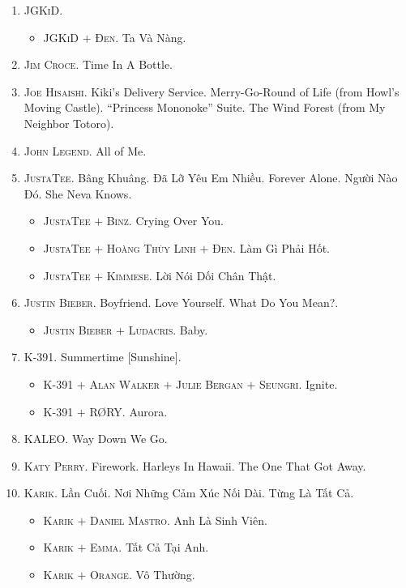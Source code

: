 \documentclass[oneside]{book}
\numberwithin{equation}{section}
\begin{document}
\begin{enumerate}
\begin{itemize}
	\end{itemize}
	\item \textsc{JGKiD.}
	\begin{itemize}
		\item \textsc{JGKiD $+$ Đen.} Ta Và Nàng.
	\end{itemize}
	\item \textsc{Jim Croce.} Time In A Bottle.
	\item \textsc{Joe Hisaishi.} Kiki's Delivery Service. Merry-Go-Round of Life (from Howl's Moving Castle). ``Princess Mononoke'' Suite. The Wind Forest (from My Neighbor Totoro).
	\item \textsc{John Legend.} All of Me.
	\item \textsc{JustaTee.} Bâng Khuâng. Đã Lỡ Yêu Em Nhiều. Forever Alone. Người Nào Đó. She Neva Knows.
	\begin{itemize}
		\item \textsc{JustaTee $+$ Binz.} Crying Over You.
		\item \textsc{JustaTee $+$ Hoàng Thùy Linh $+$ Đen.} Làm Gì Phải Hốt.
		\item \textsc{JustaTee $+$ Kimmese.} Lời Nói Dối Chân Thật.
	\end{itemize}
	\item \textsc{Justin Bieber.} Boyfriend. Love Yourself. What Do You Mean?.
	\begin{itemize}
		\item \textsc{Justin Bieber $+$ Ludacris.} Baby.
	\end{itemize}
	\item \textsc{K-391.} Summertime [Sunshine].
	\begin{itemize}
		\item \textsc{K-391 $+$ Alan Walker $+$ Julie Bergan $+$ Seungri.} Ignite.
		\item \textsc{K-391 $+$ R{\O}RY.} Aurora.
	\end{itemize}
	\item \textsc{KALEO.} Way Down We Go.
	\item \textsc{Katy Perry.} Firework. Harleys In Hawaii. The One That Got Away.
	\item \textsc{Karik.} Lần Cuối. Nơi Những Cảm Xúc Nối Dài. Từng Là Tất Cả.
	\begin{itemize}
		\item \textsc{Karik $+$ Daniel Mastro.} Anh Là Sinh Viên.
		\item \textsc{Karik $+$ Emma.} Tất Cả Tại Anh.
		\item \textsc{Karik $+$ Orange.} Vô Thường.

\end{itemize}
\end{enumerate}
\end{document}
